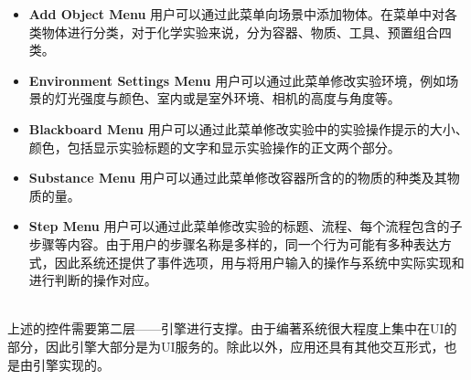 \begin{itemize}
    \item \textbf{Add Object Menu}
用户可以通过此菜单向场景中添加物体。在菜单中对各类物体进行分类，对于化学实验来说，分为容器、物质、工具、预置组合四类。
    
    \item \textbf{Environment Settings Menu}
用户可以通过此菜单修改实验环境，例如场景的灯光强度与颜色、室内或是室外环境、相机的高度与角度等。
    
    \item \textbf{Blackboard Menu}
用户可以通过此菜单修改实验中的实验操作提示的大小、颜色，包括显示实验标题的文字和显示实验操作的正文两个部分。

    \item \textbf{Substance Menu}
用户可以通过此菜单修改容器所含的的物质的种类及其物质的量。

    \item \textbf{Step Menu}
用户可以通过此菜单修改实验的标题、流程、每个流程包含的子步骤等内容。由于用户的步骤名称是多样的，同一个行为可能有多种表达方式，因此系统还提供了事件选项，用与将用户输入的操作与系统中实际实现和进行判断的操作对应。

\end{itemize}
~\\
\indent    	上述的控件需要第二层——引擎进行支撑。由于编著系统很大程度上集中在UI的部分，因此引擎大部分是为UI服务的。除此以外，应用还具有其他交互形式，也是由引擎实现的。

